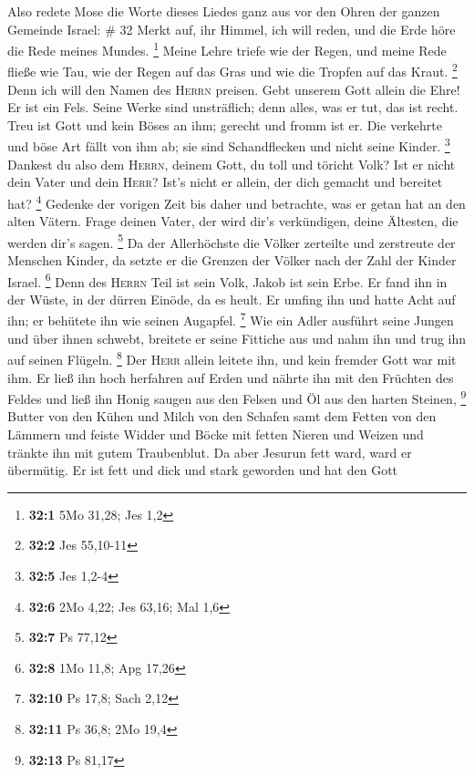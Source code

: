  Also redete Mose die Worte dieses Liedes ganz aus vor
den Ohren der ganzen Gemeinde Israel: \# 32  Merkt auf,
ihr Himmel, ich will reden, und die Erde höre die Rede meines Mundes.
\footnote{\textbf{32:1} 5Mo 31,28; Jes 1,2}  Meine Lehre
triefe wie der Regen, und meine Rede fließe wie Tau, wie der Regen auf
das Gras und wie die Tropfen auf das Kraut. \footnote{\textbf{32:2} Jes
  55,10-11}  Denn ich will den Namen des \textsc{Herrn}
preisen. Gebt unserem Gott allein die Ehre!  Er ist ein
Fels. Seine Werke sind unsträflich; denn alles, was er tut, das ist
recht. Treu ist Gott und kein Böses an ihm; gerecht und fromm ist er.
 Die verkehrte und böse Art fällt von ihm ab; sie sind
Schandflecken und nicht seine Kinder. \footnote{\textbf{32:5} Jes 1,2-4}
 Dankest du also dem \textsc{Herrn}, deinem Gott, du toll
und töricht Volk? Ist er nicht dein Vater und dein \textsc{Herr}? Ist's
nicht er allein, der dich gemacht und bereitet hat? \footnote{\textbf{32:6}
  2Mo 4,22; Jes 63,16; Mal 1,6}  Gedenke der vorigen Zeit
bis daher und betrachte, was er getan hat an den alten Vätern. Frage
deinen Vater, der wird dir's verkündigen, deine Ältesten, die werden
dir's sagen. \footnote{\textbf{32:7} Ps 77,12}  Da der
Allerhöchste die Völker zerteilte und zerstreute der Menschen Kinder, da
setzte er die Grenzen der Völker nach der Zahl der Kinder Israel.
\footnote{\textbf{32:8} 1Mo 11,8; Apg 17,26}  Denn des
\textsc{Herrn} Teil ist sein Volk, Jakob ist sein Erbe. 
Er fand ihn in der Wüste, in der dürren Einöde, da es heult. Er umfing
ihn und hatte Acht auf ihn; er behütete ihn wie seinen Augapfel.
\footnote{\textbf{32:10} Ps 17,8; Sach 2,12}  Wie ein
Adler ausführt seine Jungen und über ihnen schwebt, breitete er seine
Fittiche aus und nahm ihn und trug ihn auf seinen Flügeln. \footnote{\textbf{32:11}
  Ps 36,8; 2Mo 19,4}  Der \textsc{Herr} allein leitete
ihn, und kein fremder Gott war mit ihm.  Er ließ ihn hoch
herfahren auf Erden und nährte ihn mit den Früchten des Feldes und ließ
ihn Honig saugen aus den Felsen und Öl aus den harten Steinen,
\footnote{\textbf{32:13} Ps 81,17}  Butter von den Kühen
und Milch von den Schafen samt dem Fetten von den Lämmern und feiste
Widder und Böcke mit fetten Nieren und Weizen und tränkte ihn mit gutem
Traubenblut.  Da aber Jesurun fett ward, ward er
übermütig. Er ist fett und dick und stark geworden und hat den Gott
